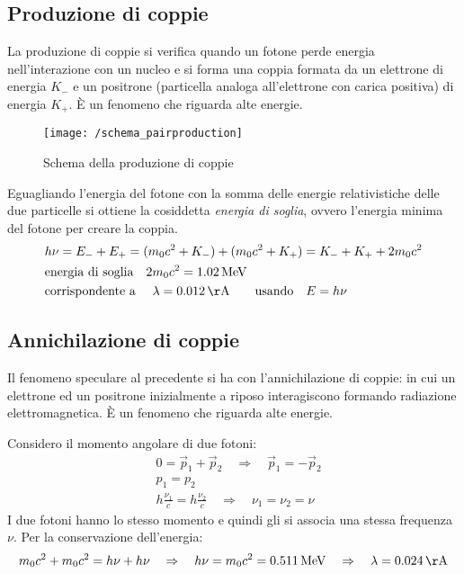 \subsection{Produzione di coppie}
La produzione di coppie si verifica quando un fotone perde energia nell'interazione con un nucleo e si forma una coppia formata da un elettrone di energia $K_-$ e un positrone (particella analoga all'elettrone con carica positiva) di energia $K_+$.
È un fenomeno che riguarda alte energie.
\begin{figure}[h]
\centering
\texttt{[image: /schema\_pairproduction]}
\caption{Schema della produzione di coppie}
\end{figure}

Eguagliando l'energia del fotone con la somma delle energie relativistiche delle due particelle si ottiene la cosiddetta \textit{energia di soglia}, ovvero l'energia minima del fotone per creare la coppia.
\begin{equation}
\begin{split}
& h\nu = E_- + E_+ = (m_0 c^2 + K_-) + (m_0 c^2 + K_+) = K_- + K_+ + 2m_0 c^2 \\
&\mbox{energia di soglia} \quad 2m_0c^2 = \SI{1.02}{MeV} \\
&\mbox{corrispondente a } \quad \lambda = \SI{0.012}{\AA} \quad \quad \mbox{usando} \quad E = h\nu
\end{split}
\end{equation}


\subsection{Annichilazione di coppie}
Il fenomeno speculare al precedente si ha con l'annichilazione di coppie: in cui un elettrone ed un positrone inizialmente a riposo interagiscono formando radiazione elettromagnetica.
È un fenomeno che riguarda alte energie.

Considero il momento angolare di due fotoni:
\begin{equation}
\begin{split}
& 0 = \vec p_1 + \vec p_2 \quad \Rightarrow \quad \vec p_1 = - \vec p_2 \\
& p_1 = p_2 \\
& h \frac{ \nu_1}{c } = h \frac{ \nu_2}{c } \quad \Rightarrow \quad \nu_1 = \nu_2 = \nu
\end{split}
\end{equation}
I due fotoni hanno lo stesso momento e quindi gli si associa una stessa frequenza $\nu$.
Per la conservazione dell'energia:
\begin{equation}
m_0 c^2 + m_0 c^2 = h\nu + h\nu \quad \Rightarrow \quad 
h\nu = m_0 c^2 = \SI{0.511}{MeV} \quad \Rightarrow \quad
\lambda = \SI{0.024}{\AA}
\end{equation}


